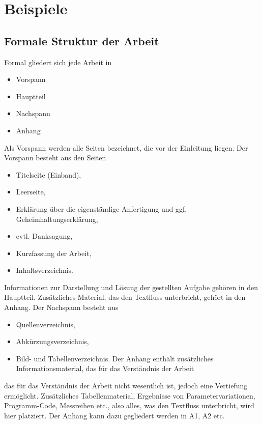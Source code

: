 \clearpage
\chapter{\textbf{Beispiele}}\label{beispiele}

\section{Formale Struktur der Arbeit}

Formal gliedert sich jede Arbeit in  
\begin{itemize}
\item Vorspann
\item Hauptteil
\item Nachspann 
\item Anhang
\end{itemize}
\vspace{0.5cm}

Als Vorspann werden alle Seiten bezeichnet, die vor der Einleitung liegen. Der Vorspann 
besteht aus den Seiten 

\begin{itemize}
\item Titelseite (Einband), 
\item Leerseite,
\item Erklärung über die eigenständige Anfertigung und ggf. Geheimhaltungserklärung, 
\item evtl. Danksagung, 
\item Kurzfassung der Arbeit,  
\item  Inhaltsverzeichnis.
\end{itemize}
\vspace{0.5cm}

Informationen zur Darstellung und Lösung der gestellten Aufgabe gehören in den Hauptteil. Zusätzliches Material, das den Textfluss unterbricht, gehört in den Anhang.  Der Nachspann besteht aus 

\begin{itemize}
\item Quellenverzeichnis, 
\item Abkürzungsverzeichnis, 
\item Bild- und Tabellenverzeichnis.  Der Anhang enthält zusätzliches Informationsmaterial, das für das Verständnis der Arbeit 
\end{itemize}

das für das Verständnis der Arbeit nicht wesentlich ist, jedoch eine Vertiefung ermöglicht. Zusätzliches Tabellenmaterial, Ergebnisse von Parametervariationen, Programm-Code, Messreihen etc., also alles, was den Textfluss unterbricht, wird hier platziert. Der Anhang kann dazu gegliedert werden in A1, A2 etc.\\  

